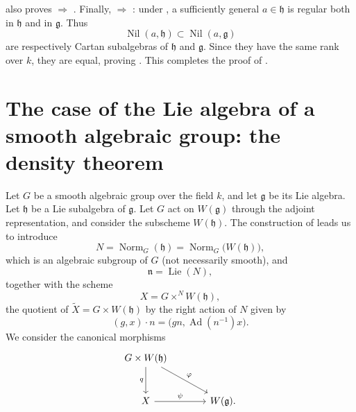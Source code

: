  also proves  \(\Rightarrow\) . Finally,
 \(\Rightarrow\) : under , a sufficiently general
\(a\in\mathfrak h\) is regular both in \(\mathfrak h\) and in
\(\mathfrak g\). Thus
\[
  \operatorname{Nil}(a,\mathfrak h)
  \subset
  \operatorname{Nil}(a,\mathfrak g)
\]
are respectively Cartan subalgebras of \(\mathfrak h\) and
\(\mathfrak g\). Since they have the same rank over \(k\), they are
equal, proving . This completes the proof of .



\section{The case of the Lie algebra of a smooth algebraic group:
the density theorem}

Let \(G\) be a smooth algebraic group over the field \(k\), and let
\(\mathfrak g\) be its Lie algebra. Let \(\mathfrak h\) be a Lie
subalgebra of \(\mathfrak g\). Let \(G\) act on \(W(\mathfrak g)\)
through the adjoint representation, and consider the subscheme
\(W(\mathfrak h)\). The construction of  leads us to introduce
\[
  N=\operatorname{Norm}_G(\mathfrak h)
   =\operatorname{Norm}_G\bigl(W(\mathfrak h)\bigr),
\]
which is an algebraic subgroup of \(G\) (not necessarily smooth), and
\[
  \mathfrak n=\operatorname{Lie}(N),
\]
together with the scheme
\[
  X=G\times^N W(\mathfrak h),
\]
the quotient of \(\widetilde X=G\times W(\mathfrak h)\) by the right
action of \(N\) given by
\[
  (g,x)\cdot n=\bigl(gn,\operatorname{Ad}(n^{-1})x\bigr).
\]
We consider the canonical morphisms
\[
\begin{tikzcd}[column sep=large,row sep=large]
G\times W(\mathfrak h)
  \arrow[d,"q"']
  \arrow[dr,"\varphi"] & \\
X \arrow[r,"\psi"] & W(\mathfrak g).
\end{tikzcd}
\]

